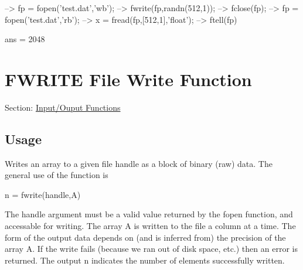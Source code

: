 \begin{DoxyVerbInclude}
--> fp = fopen('test.dat','wb');
--> fwrite(fp,randn(512,1));
--> fclose(fp);
--> fp = fopen('test.dat','rb');
--> x = fread(fp,[512,1],'float');
--> ftell(fp)

ans = 
 2048 
\end{DoxyVerbInclude}
 \hypertarget{io_fwrite}{}\section{F\-W\-R\-I\-T\-E File Write Function}\label{io_fwrite}
Section\-: \hyperlink{sec_io}{Input/\-Ouput Functions} \hypertarget{vtkwidgets_vtkxyplotwidget_Usage}{}\subsection{Usage}\label{vtkwidgets_vtkxyplotwidget_Usage}
Writes an array to a given file handle as a block of binary (raw) data. The general use of the function is \begin{DoxyVerb}  n = fwrite(handle,A)
\end{DoxyVerb}
 The {\ttfamily handle} argument must be a valid value returned by the fopen function, and accessable for writing. The array {\ttfamily A} is written to the file a column at a time. The form of the output data depends on (and is inferred from) the precision of the array {\ttfamily A}. If the write fails (because we ran out of disk space, etc.) then an error is returned. The output {\ttfamily n} indicates the number of elements successfully written.

